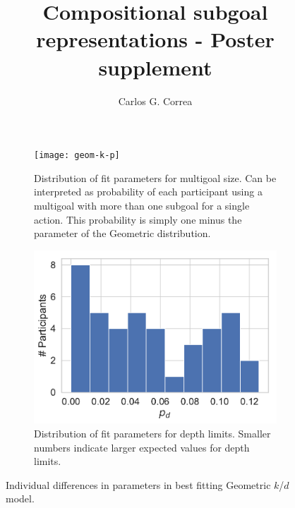 \documentclass[11pt, oneside]{article}          %
\title{\vspace{-2.0cm}Compositional subgoal representations - Poster supplement}
\author{Carlos G. Correa}
\date{}
\begin{document}
\maketitle
%

\begin{figure}[ht]
  \centering
  \begin{subfigure}[t]{0.45\textwidth}
    \texttt{[image: geom-k-p]}
    \caption{Distribution of fit parameters for multigoal size. Can be interpreted as probability of each participant using a multigoal with more than one subgoal for a single action. This probability is simply one minus the parameter of the Geometric distribution.}
  \end{subfigure}
  \hspace{1em} %
  \begin{subfigure}[t]{0.45\textwidth}
    \includegraphics[width=\textwidth]{geom-k-d}
    \caption{Distribution of fit parameters for depth limits. Smaller numbers indicate larger expected values for depth limits.}
  \end{subfigure}
  \caption{Individual differences in parameters in best fitting Geometric $k$/$d$ model.}
  \label{fig:rpe}
\end{figure}
\end{document}
